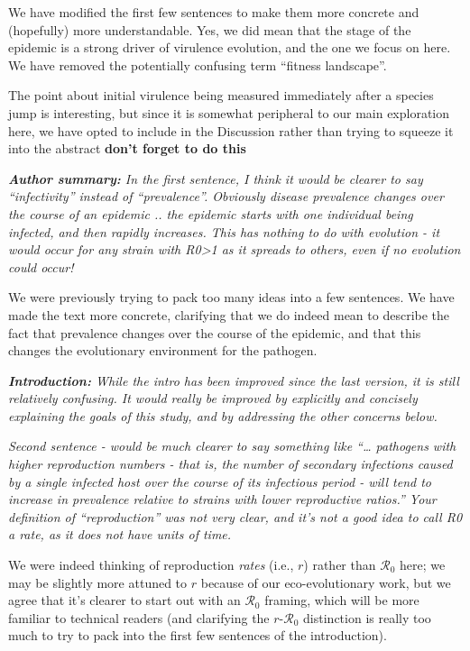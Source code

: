 \documentclass[10pt]{letter}
\newcommand{\revcomment}[1]{\emph{#1}}
\newcommand{\response}[1]{#1}
\newcommand{\rzero}{\ensuremath{\mathcal R}_0}
\begin{document}
\begin{letter}{
}
\response{We have modified the first few sentences to make them
more concrete and (hopefully) more understandable. 
Yes, we did mean that the stage of the epidemic is a strong
driver of virulence evolution, and the one we focus on here.
We have removed the potentially confusing term ``fitness landscape''.

The point about initial virulence being measured immediately after
a species jump is interesting, but since it is somewhat peripheral
to our main exploration here, we have opted to include in the 
Discussion rather than trying to squeeze it into the abstract
\textbf{don't forget to do this}
}

\revcomment{
\textbf{Author summary:} In the first sentence, I think it would be clearer to say “infectivity” instead of “prevalence”. Obviously disease prevalence changes over the course of an epidemic .. the epidemic starts with one individual being infected, and then rapidly increases. This has nothing to do with evolution - it would occur for any strain with R0>1 as it spreads to others, even if no evolution could occur!
}

\response{We were previously trying to pack too many ideas into a few sentences. We have made the text more concrete, clarifying that we do indeed mean to describe the fact that prevalence changes over the course of the epidemic, and that this changes the evolutionary environment for the pathogen.}

\revcomment{\textbf{Introduction:}
While the intro has been improved since the last version, it is still relatively confusing. It would really be improved by explicitly and concisely explaining the goals of this study, and by addressing the other concerns below.
}

\revcomment{
Second sentence - would be much clearer to say something like “… pathogens with higher reproduction numbers - that is, the number of secondary infections caused by a single infected host over the course of its infectious period - will tend to increase in prevalence relative to strains with lower reproductive ratios.” Your definition of “reproduction” was not very clear, and it’s not a good idea to call R0 a rate, as it does not have units of time.
}

\response{
We were indeed thinking of reproduction \emph{rates} (i.e., $r$) rather than $\rzero$ here; we may be slightly more
attuned to $r$ because of our eco-evolutionary work, but we agree that it's clearer to start out with an $\rzero$
framing, which will be more familiar to technical readers (and clarifying the $r$-$\rzero$ distinction is really too much to try to pack into the first few sentences of the introduction).
}


\end{letter}
\end{document}
